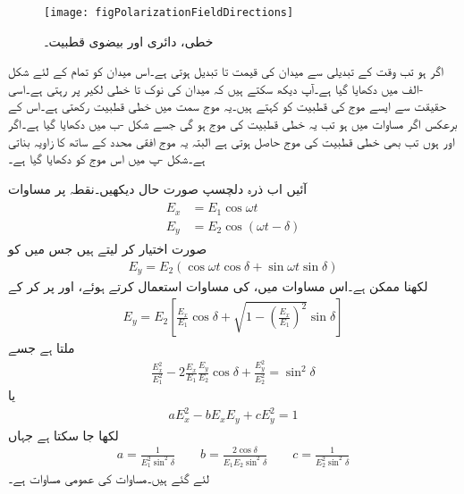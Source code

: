 \begin{figure}
\centering
\texttt{[image: figPolarizationFieldDirections]}
\caption{خطی، دائری اور بیضوی قطبیت۔}
\label{شکل_قطبیت_خطی_قطبیت}
\end{figure}
اگر  ہو تب وقت  کے تبدیلی سے میدان کی قیمت  تا  تبدیل ہوتی ہے۔اس میدان کو تمام  کے لئے شکل -الف میں دکھایا گیا ہے۔آپ دیکھ سکتے ہیں کہ میدان کی نوک  تا  خطی لکیر پر رہتی ہے۔اسی حقیقت سے ایسے موج کی قطبیت کو   کہتے ہیں۔یہ موج  سمت میں خطی قطبیت رکھتی ہے۔اس کے برعکس اگر مساوات  میں  ہو تب یہ  خطی قطبیت کی موج ہو گی جسے شکل -ب میں دکھایا گیا ہے۔اگر  اور  ہوں تب بھی خطی قطبیت کی موج حاصل ہوتی ہے البتہ یہ موج افقی محدد کے ساتھ  کا زاویہ بناتی ہے۔شکل -پ میں اس موج کو دکھایا گیا ہے۔

آئیں اب ذرہ دلچسپ صورت حال دیکھیں۔نقطہ  پر مساوات 
\begin{gather}
\begin{aligned}\label{مساوات_قطبیت_ابتدائی_نقطے_پر_میدان}
E_x&=E_1 \cos \omega t\\
E_y&=E_2 \cos (\omega t  -\delta)
\end{aligned}
\end{gather}
صورت اختیار کر لیتے ہیں جس میں  کو
\begin{align*}
E_y=E_2 \left(\cos \omega t \cos \delta + \sin \omega t \sin \delta\right)
\end{align*}
لکھنا ممکن ہے۔اس مساوات میں،   کی مساوات استعمال کرتے ہوئے،   اور  پر کر کے
\begin{align*}
E_y=E_2 \left[\frac{E_x}{E_1} \cos \delta+\sqrt{1-\left(\frac{E_x}{E_1}\right)^2} \sin \delta\right]
\end{align*}
ملتا ہے جسے
\begin{align}\label{مساوات_قطبیت_عمومی_بیضوی_قطبیت_الف}
\frac{E_x^2}{E_1^2}-2 \frac{E_x}{E_1} \frac{E_y}{E_2} \cos \delta +\frac{E_y^2}{E_2^2}=\sin^2 \delta
\end{align}
یا
\begin{align}\label{مساوات_قطبیت_عمومی_بیضوی_قطبیت_ب}
a E_x^2-b E_x E_y +c E_y^2=1
\end{align}
لکھا جا سکتا ہے جہاں
\begin{align}
a=\frac{1}{E_1^2 \sin^2 \delta} \quad \quad b=\frac{2 \cos \delta}{E_1 E_2 \sin^2 \delta} \quad \quad c=\frac{1}{E_2^2 \sin^2 \delta}
\end{align}
لئے گئے ہیں۔مساوات   کی عمومی مساوات ہے۔

